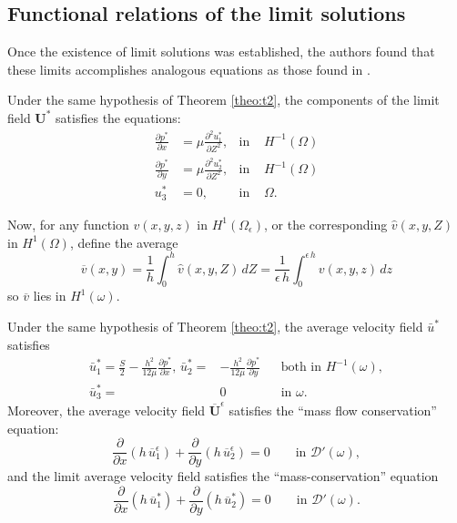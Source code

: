 \subsection*{Functional relations of the limit solutions}
Once the existence of limit solutions was established, the authors found that these limits accomplishes analogous equations as those found in .
\begin{theorem}
Under the same hypothesis of Theorem \ref{theo:t2}, the components of the limit field $\mathbf{U}^*$ satisfies the equations:
\begin{align*}
\frac{\partial p^*}{\partial x}&=\mu \frac{\partial^2 u_1^*}{\partial Z^2},&\text{in }&H^{-1}(\Omega)\\
\frac{\partial p^*}{\partial y}&=\mu\frac{\partial^2 u_2^*}{\partial Z^2},&\text{in }&H^{-1}(\Omega)\\
 u_3^*&=0,&\text{in }&\Omega.
\end{align*}
\end{theorem}
Now, for any function $v(x,y,z)$ in $H^1(\Omega_\epsilon)$, or the corresponding $\hat{v}(x,y,Z)$ in $H^1(\Omega)$, define the average $$\overline{v}(x,y)=\frac{1}{h}\int_0^h \hat{v}(x,y,Z)\,dZ=\frac{1}{\epsilon\,h}\int _0^{\epsilon\,h}v(x,y,z)\,dz$$
so $\overline{v}$ lies in $H^1(\omega)$.

\begin{theorem}
Under the same hypothesis of Theorem \ref{theo:t2}, the average velocity field $\bar{u}^*$ satisfies
\begin{align*}
\bar{u}_1^*=\frac{S}{2}-\frac{h^2}{12\mu}\frac{\partial p^*}{\partial x},\,\bar{u}_2^* ={}& -\frac{h^2}{12\mu}\frac{\partial p^*}{\partial y} && \text{both in }H^{-1}(\omega),\\
\bar{u}_3^* ={}& 0 & &\text{in }\omega.
\end{align*}
Moreover, the average velocity field $\overline{\mathbf{U}}^\epsilon$ satisfies the ``mass flow conservation'' equation:
\begin{equation*}
\frac{\partial}{\partial x}\left(h\,\overline{u}_1^\epsilon\right)+\frac{\partial}{\partial y}\left(h\,\overline{u}_2^\epsilon\right)=0\qquad \text{in }\mathcal{D}'(\omega),
\end{equation*}
and the limit average velocity field satisfies the ``mass-conservation'' equation
\begin{equation*}
\frac{\partial}{\partial x}\left(h\,\overline{u}_1^*\right)+\frac{\partial}{\partial y}\left(h\,\overline{u}_2^*\right)=0\qquad \text{in }\mathcal{D}'(\omega).
\end{equation*}
\end{theorem}

